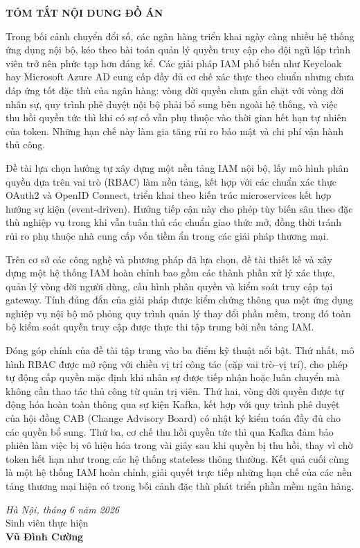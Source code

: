 \documentclass[../DoAn.tex]{subfiles}
\begin{document}
\begin{center}
    \Large{\textbf{TÓM TẮT NỘI DUNG ĐỒ ÁN}}\\
\end{center}
\vspace{1cm}
Trong bối cảnh chuyển đổi số, các ngân hàng triển khai ngày càng nhiều hệ thống ứng dụng nội bộ, kéo theo bài toán quản lý quyền truy cập cho đội ngũ lập trình viên trở nên phức tạp hơn đáng kể. Các giải pháp IAM phổ biến như Keycloak hay Microsoft Azure AD cung cấp đầy đủ cơ chế xác thực theo chuẩn nhưng chưa đáp ứng tốt đặc thù của ngân hàng: vòng đời quyền chưa gắn chặt với vòng đời nhân sự, quy trình phê duyệt nội bộ phải bổ sung bên ngoài hệ thống, và việc thu hồi quyền tức thì khi có sự cố vẫn phụ thuộc vào thời gian hết hạn tự nhiên của token. Những hạn chế này làm gia tăng rủi ro bảo mật và chi phí vận hành thủ công.

Đề tài lựa chọn hướng tự xây dựng một nền tảng IAM nội bộ, lấy mô hình phân quyền dựa trên vai trò (RBAC) làm nền tảng, kết hợp với các chuẩn xác thực OAuth2 và OpenID Connect, triển khai theo kiến trúc microservices kết hợp hướng sự kiện (event-driven). Hướng tiếp cận này cho phép tùy biến sâu theo đặc thù nghiệp vụ trong khi vẫn tuân thủ các chuẩn giao thức mở, đồng thời tránh rủi ro phụ thuộc nhà cung cấp vốn tiềm ẩn trong các giải pháp thương mại.

Trên cơ sở các công nghệ và phương pháp đã lựa chọn, đề tài thiết kế và xây dựng một hệ thống IAM hoàn chỉnh bao gồm các thành phần xử lý xác thực, quản lý vòng đời người dùng, cấu hình phân quyền và kiểm soát truy cập tại gateway. Tính đúng đắn của giải pháp được kiểm chứng thông qua một ứng dụng nghiệp vụ nội bộ mô phỏng quy trình quản lý thay đổi phần mềm, trong đó toàn bộ kiểm soát quyền truy cập được thực thi tập trung bởi nền tảng IAM.

Đóng góp chính của đề tài tập trung vào ba điểm kỹ thuật nổi bật. Thứ nhất, mô hình RBAC được mở rộng với chiều vị trí công tác (cặp vai trò--vị trí), cho phép tự động cấp quyền mặc định khi nhân sự được tiếp nhận hoặc luân chuyển mà không cần thao tác thủ công từ quản trị viên. Thứ hai, vòng đời quyền được tự động hóa hoàn toàn thông qua sự kiện Kafka, kết hợp với quy trình phê duyệt của hội đồng CAB (Change Advisory Board) có nhật ký kiểm toán đầy đủ cho các quyền bổ sung. Thứ ba, cơ chế thu hồi quyền tức thì qua Kafka đảm bảo phiên làm việc bị vô hiệu hóa trong vài giây sau khi quyền bị thu hồi, thay vì chờ token hết hạn như trong các hệ thống stateless thông thường. Kết quả cuối cùng là một hệ thống IAM hoàn chỉnh, giải quyết trực tiếp những hạn chế của các nền tảng thương mại hiện có trong bối cảnh đặc thù phát triển phần mềm ngân hàng.
\begin{flushright}
\textit{Hà Nội, tháng 6 năm 2026}\\[6pt]
Sinh viên thực hiện\\[4pt]
\textbf{Vũ Đình Cường}
\end{flushright}
\end{document}
